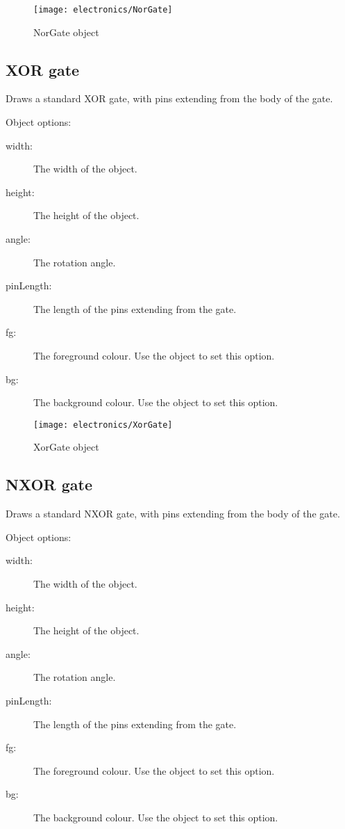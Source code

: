 \begin{figure}[h]
\centerline{\texttt{[image: electronics/NorGate]}}
\caption{NorGate object}
\label{fig:nor_gate}
\end{figure}

\subsection{XOR gate}
Draws a standard XOR gate, with pins extending from the body of the gate.

Object options:
\begin{description}
\item[width:] The width of the object.
\item[height:] The height of the object.
\item[angle:] The rotation angle.
\item[pinLength:] The length of the pins extending from the gate.
\item[fg:] The foreground colour.  Use the  object to set this
option.
\item[bg:] The background colour.  Use the  object to set this
option.
\end{description}

\begin{figure}[h]
\centerline{\texttt{[image: electronics/XorGate]}}
\caption{XorGate object}
\label{fig:Xor_gate}
\end{figure}

\subsection{NXOR gate}
Draws a standard NXOR gate, with pins extending from the body of the gate.

Object options:
\begin{description}
\item[width:] The width of the object.
\item[height:] The height of the object.
\item[angle:] The rotation angle.
\item[pinLength:] The length of the pins extending from the gate.
\item[fg:] The foreground colour.  Use the  object to set this
option.
\item[bg:] The background colour.  Use the  object to set this
option.
\end{description}

